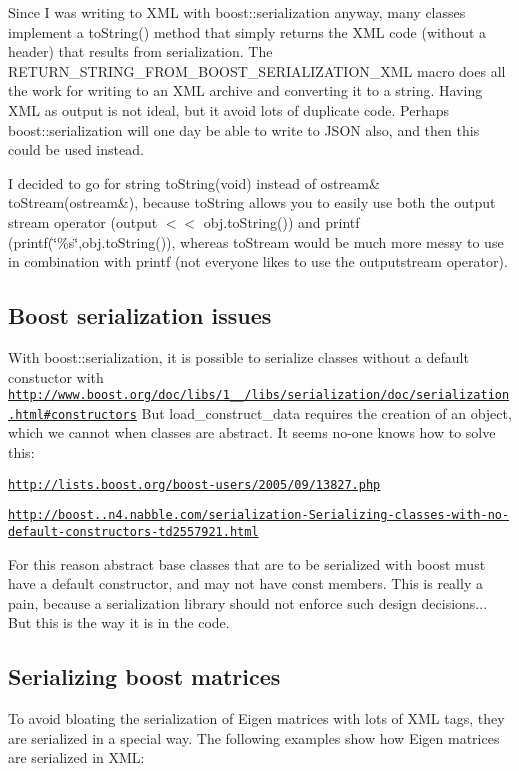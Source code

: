 Since I was writing to X\+M\+L with boost\+::serialization anyway, many classes implement a to\+String() method that simply returns the X\+M\+L code (without a header) that results from serialization. The R\+E\+T\+U\+R\+N\+\_\+\+S\+T\+R\+I\+N\+G\+\_\+\+F\+R\+O\+M\+\_\+\+B\+O\+O\+S\+T\+\_\+\+S\+E\+R\+I\+A\+L\+I\+Z\+A\+T\+I\+O\+N\+\_\+\+X\+M\+L macro does all the work for writing to an X\+M\+L archive and converting it to a string. Having X\+M\+L as output is not ideal, but it avoid lots of duplicate code. Perhaps boost\+::serialization will one day be able to write to J\+S\+O\+N also, and then this could be used instead.

I decided to go for string to\+String(void) instead of ostream\& to\+Stream(ostream\&), because to\+String allows you to easily use both the output stream operator (output $<$$<$ obj.\+to\+String()) and printf (printf(\char`\"{}\%s\char`\"{},obj.\+to\+String()), whereas to\+Stream would be much more messy to use in combination with printf (not everyone likes to use the outputstream operator).\hypertarget{page_serialization_sec_boost_serialization_ugliness}{}\subsection{Boost serialization issues}\label{page_serialization_sec_boost_serialization_ugliness}
With boost\+::serialization, it is possible to serialize classes without a default constuctor with \href{http://www.boost.org/doc/libs/1_55_0/libs/serialization/doc/serialization.html#constructors}{\tt http\+://www.\+boost.\+org/doc/libs/1\+\_\+\_/libs/serialization/doc/serialization.\+html\#constructors} But load\+\_\+construct\+\_\+data requires the creation of an object, which we cannot when classes are abstract. It seems no-\/one knows how to solve this\+: \begin{DoxyItemize}
\item \href{http://lists.boost.org/boost-users/2005/09/13827.php}{\tt http\+://lists.\+boost.\+org/boost-\/users/2005/09/13827.\+php} \item \href{http://boost.2283326.n4.nabble.com/serialization-Serializing-classes-with-no-default-constructors-td2557921.html}{\tt http\+://boost..\+n4.\+nabble.\+com/serialization-\/\+Serializing-\/classes-\/with-\/no-\/default-\/constructors-\/td2557921.\+html}\end{DoxyItemize}
For this reason abstract base classes that are to be serialized with boost must have a default constructor, and may not have const members. This is really a pain, because a serialization library should not enforce such design decisions... But this is the way it is in the code.\hypertarget{page_serialization_sec_eigen_boost_serialization}{}\subsection{Serializing boost matrices}\label{page_serialization_sec_eigen_boost_serialization}
To avoid bloating the serialization of Eigen matrices with lots of X\+M\+L tags, they are serialized in a special way. The following examples show how Eigen matrices are serialized in X\+M\+L\+:

